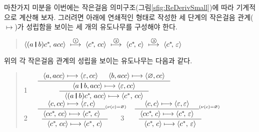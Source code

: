 마찬가지 미분을 이번에는 작은걸음 의미구조(그림\;\ref{sfig:ReDerivSmall})에
따라 기계적으로 계산해 보자. 그러려면 아래에 연쇄적인 형태로 작성한
세 단계의 작은걸음 관계($\longmapsto$)가 성립함을 보이는
세 개의 유도나무를 구성해야 한다. \vspace*{-1ex}
\begin{quote}
\( \langle(a\VERT b)c^{*}\!,\,acc\rangle
~\stackrel{\text{\footnotesize\textcircled{\tiny 1}}}{\longmapsto}~
\langle c^{*}\!,\,cc\rangle
~\stackrel{\text{\footnotesize\textcircled{\tiny 2}}}{\longmapsto}~
\langle c^{*}\!,\,c\rangle
~\stackrel{\text{\footnotesize\textcircled{\tiny 3}}}{\longmapsto}~
\langle c^{*}\!,\,\varepsilon\rangle \) \vspace*{-1.25ex}
\end{quote}
위의 각 작은걸음 관계의 성립을 보이는 유도나무는 다음과 같다.
\begin{quote}
 \textcircled{\small 1}
 $\inference*{
    \inference{
       \langle a,acc\rangle \longmapsto \langle\varepsilon,cc\rangle
     & \langle b,acc\rangle \longmapsto \langle\varnothing,cc\rangle
    }{
    \langle a\VERT b,acc\rangle \longmapsto \langle\varepsilon,cc\rangle
    }
  }{
  \langle(a\VERT b)c^{*}\!,\,acc\rangle \longmapsto
  \langle c^{*},\,cc\rangle
 }$
 \\[2.5ex]
 \textcircled{\small 2}
 $\inference*{
    \inference{
       \langle c,cc\rangle \longmapsto \langle\varepsilon,c\rangle
    }{
    \langle cc^{*}\!,\,cc\rangle \longmapsto \langle c^{*}\!,\,c\rangle
    }
    \text{\small$\!^{(\nu(c)=\varnothing)}$\hspace{-6ex}}
  }{
  \langle c^{*}\!,\,cc\rangle \longmapsto
  \langle c^{*},\,c\rangle
 }$
 \qquad
 \textcircled{\small 3}
 $\inference*{
    \inference{
       \langle c,c\rangle \longmapsto \langle\varepsilon,\varepsilon\rangle
    }{
    \langle cc^{*}\!,\,c\rangle \longmapsto \langle c^{*}\!,\,\varepsilon\rangle
    }
    \text{\small$\!^{(\nu(c)=\varnothing)}$\hspace{-6ex}}
  }{
  \langle c^{*}\!,\,c\rangle \longmapsto
  \langle c^{*},\,\varepsilon\rangle
 }$
\end{quote}

